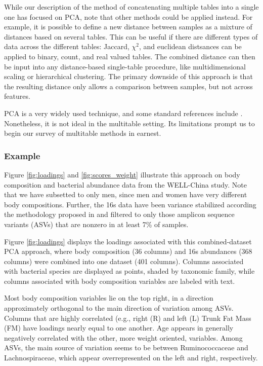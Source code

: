 \documentclass{article}
\begin{document}
While our description of the method of concatenating multiple tables into a
single one has focused on PCA, note that other methods could be applied instead.
For example, it is possible to define a new distance between samples as a
mixture of distances based on several tables. This can be useful if there are
different types of data across the different tables: Jaccard, $\chi^{2}$, and
euclidean distsances can be applied to binary, count, and real valued tables.
The combined distance can then be input into any distance-based single-table
procedure, like multidimensional scaling or hierarchical clustering. The primary
downside of this approach is that the resulting distance only allows a
comparison between samples, but not across features.

PCA is a very widely used technique, and some standard references include
\citep{friedman2001elements, mardia1980multivariate, pages2014multiple}.
Nonetheless, it is not ideal in the multitable setting. Its limitations prompt
us to begin our survey of multitable methods in earnest.

\subsubsection{Example}
\label{subsec:pca_example}

Figure \ref{fig:loadings} and \ref{fig:scores_weight} illustrate this approach
on body composition and bacterial abundance data from the WELL-China study.
Note that we have subsetted to only men, since men and women have very different
body compositions. Further, the 16s data have been variance stabilized according
the methodology proposed in \citep{Anders2010} and filtered to only those
amplicon sequence variants (ASVs) that are nonzero in at least 7\% of samples.

Figure \ref{fig:loadings} displays the loadings associated with this
combined-dataset PCA approach, where body composition (36 columns) and 16s
abundances (368 columns) were combined into one dataset (401 columns). Columns
associated with bacterial species are displayed as points, shaded by taxonomic
family, while columns associated with body composition variables are labeled
with text.

Most body composition variables lie on the top right, in a direction
approximately orthogonal to the main direction of variation among ASVs. Columns
that are highly correlated (e.g., right (R) and left (L) Trunk Fat Mass (FM)
have loadings nearly equal to one another. Age appears in generally negatively
correlated with the other, more weight oriented, variables. Among ASVs, the main
source of variation seems to be between Ruminococcaceae and Lachnospiraceae,
which appear overrepresented on the left and right, respectively.
\end{document}
